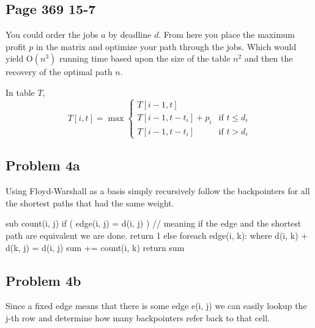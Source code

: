\documentclass[12pt,twoside,letterpaper]{article}
\begin{document}
\subsection*{Page 369 15-7}
You could order the jobs $a$ by deadline $d$. From here you place the maximum profit $p$ in the matrix and optimize your path through the jobs. Which would yield $\textrm{O}(n^3)$ running time based upon the size of the table $n^2$ and then the recovery of the optimal path $n$.

In table $T$,
\[ T[i,t] = \max \left\{ \begin{array}{ll}
T[i-1,t]\\
T[i-1,t-t_i]+p_i & \mbox{if $t \le d_i$}\\
T[i-1,t-t_i] & \mbox{if $t > d_i$}\end{array} \right. \] 

\subsection*{Problem 4a}
Using Floyd-Warshall as a basis simply recursively follow the backpointers for all the shortest paths that had the same weight.

sub count(i, j)
	if ( edge(i, j) = d(i, j) ) // meaning if the edge and the shortest path are equivalent we are done.
		return 1
	else
		foreach edge(i, k): where d(i, k) + d(k, j) = d(i, j)
		sum += count(i, k)
		return sum

\subsection*{Problem 4b}
Since a fixed edge means that there is some edge e(i, j) we can easily lookup the j-th row and determine how many backpointers refer back to that cell.
\end{document}
